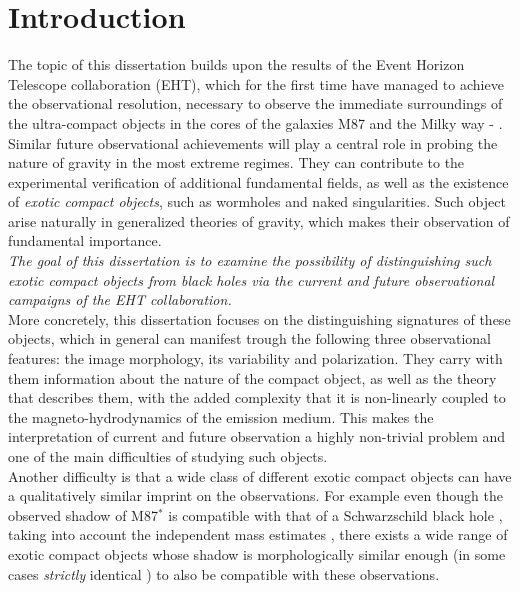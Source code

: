 \documentclass[12pt]{article}
\numberwithin{equation}{section}
\numberwithin{figure}{section}
\begin{document}
	\nocite{EHT_M87_I,
		EHT_M87_II,
		EHT_M87_III,
		EHT_M87_IV,
		EHT_M87_V,
		EHT_M87_VI,
		EHT_M87_VII,
		EHT_M87_VIII,
		EHT_M87_IX,
		EHT_SGR_I,
		EHT_SGR_II,
		EHT_SGR_III,
		EHT_SGR_IV,
		EHT_SGR_V,
		EHT_SGR_VI,
		EHT_SGR_VII,
		EHT_SGR_VIII}
	
	\tableofcontents
	\listoffigures
	\listoftables
	\newpage
	
	\section{Introduction}
	
	The topic of this dissertation builds upon the results of the Event Horizon Telescope collaboration (EHT), which for the first time have managed to achieve the observational resolution, necessary to observe the immediate surroundings of the ultra-compact objects in the cores of the galaxies M87 and the Milky way \cite{EHT_M87_I} - \cite{EHT_SGR_VIII}. Similar future observational achievements will play a central role in probing the nature of gravity in the most extreme regimes. They can contribute to the experimental verification of additional fundamental fields, as well as the existence of \emph{exotic compact objects}, such as wormholes and naked singularities. Such object arise naturally in generalized theories of gravity, which makes their observation of fundamental importance.\\
	
	\emph{The goal of this dissertation is to examine the possibility of distinguishing such exotic compact objects from black holes via the current and future observational campaigns of the EHT collaboration.}\\
	
	\noindent More concretely, this dissertation focuses on the distinguishing signatures of these objects, which in general can manifest trough the following three observational features: the image morphology, its variability and polarization. They carry with them information about the nature of the compact object, as well as the theory that describes them, with the added complexity that it is non-linearly coupled to the magneto-hydrodynamics of the emission medium. This makes the interpretation of current and future observation a highly non-trivial problem and one of the main difficulties of studying such objects.\\
	
	\noindent Another difficulty is that a wide class of different exotic compact objects can have a qualitatively similar imprint on the observations. For example even though the observed shadow of M87$^*$ is compatible with that of a Schwarzschild black hole \cite{EHT_M87_I}, taking into account the independent mass estimates \cite{Gebhardt_2011}, there exists a wide range of exotic compact objects whose shadow is morphologically similar enough (in some cases \emph{strictly} identical \cite{PhysRevD.103.084040}) to also be compatible with these observations.\\
	
\end{document}
